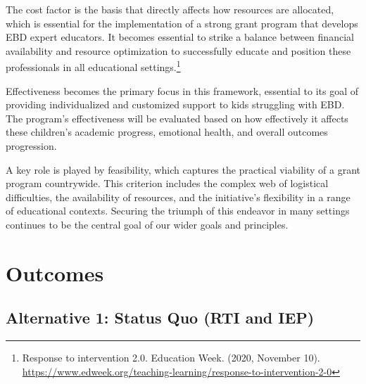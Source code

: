 \documentclass[11pt]{article}
\begin{document}
The cost factor is the basis that directly affects how resources are allocated, which is essential for the implementation of a strong grant program that develops EBD expert educators. It becomes essential to strike a balance between financial availability and resource optimization to successfully educate and position these professionals in all educational settings.\footnote{Response to intervention 2.0. Education Week. (2020, November 10). \url{https://www.edweek.org/teaching-learning/response-to-intervention-2-0}}

Effectiveness becomes the primary focus in this framework, essential to its goal of providing individualized and customized support to kids struggling with EBD. The program's effectiveness will be evaluated based on how effectively it affects these children's academic progress, emotional health, and overall outcomes progression.

A key role is played by feasibility, which captures the practical viability of a grant program countrywide. This criterion includes the complex web of logistical difficulties, the availability of resources, and the initiative's flexibility in a range of educational contexts. Securing the triumph of this endeavor in many settings continues to be the central goal of our wider goals and principles.

\section{Outcomes}

\subsection{Alternative 1: Status Quo (RTI and IEP)}
\end{document}
